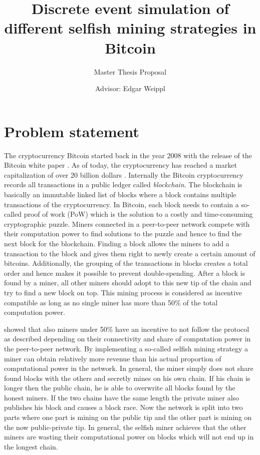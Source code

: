 \documentclass{scrartcl}
\title{Discrete event simulation of different selfish mining strategies in Bitcoin}
\subtitle{Master Thesis Proposal}
\author{Advisor: Edgar Weippl}
\begin{document}
\maketitle

\section{Problem statement}
The cryptocurrency Bitcoin started back in the year 2008 with the release of the Bitcoin white paper \cite{nakamoto2008bitcoin}.
As of today, the cryptocurrency has reached a market capitalization of over 20 billion dollars \cite{marketcap2017}.
Internally the Bitcoin cryptocurrency records all transactions in a public ledger called \emph{blockchain}.
The blockchain is basically an immutable linked list of blocks where a block contains multiple transactions of the cryptocurrency.
In Bitcoin, each block needs to contain a so-called proof of work (PoW) which is the solution to a costly and time-consuming cryptographic puzzle.
Miners connected in a peer-to-peer network compete with their computation power to find solutions to the puzzle and hence to find the next block for the blockchain.
Finding a block allows the miners to add a transaction to the block and gives them right to newly create a certain amount of bitcoins.
Additionally, the grouping of the transactions in blocks creates a total order and hence makes it possible to prevent double-spending.
After a block is found by a miner, all other miners should adopt to this new tip of the chain and try to find a new block on top.
This mining process is considered as incentive compatible as long as no single miner has more than 50\% of the total computation power.

\citeauthor{eyal2014majority} showed that also miners under 50\% have an incentive to not follow the protocol as described depending on their connectivity and share of computation power in the peer-to-peer network.
By implementing a so-called selfish mining strategy a miner can obtain relatively more revenue than his actual proportion of computational power in the network.
In general, the miner simply does not share found blocks with the others and secretly mines on his own chain.
If his chain is longer then the public chain, he is able to overwrite all blocks found by the honest miners.
If the two chains have the same length the private miner also publishes his block and causes a block race.
Now the network is split into two parts where one part is mining on the public tip and the other part is mining on the now public-private tip.
In general, the selfish miner achieves that the other miners are wasting their computational power on blocks which will not end up in the longest chain.
\end{document}
